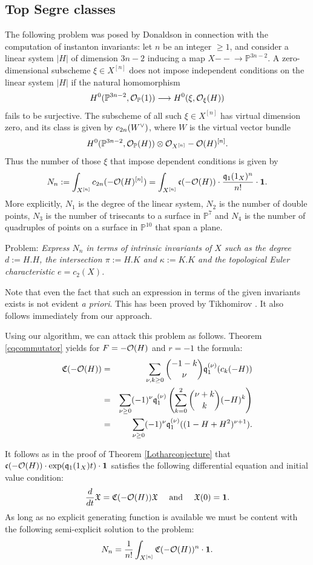\documentclass[twoside,11pt]{article}
\newcommand{\ko}{{\cal O}}
\newcommand{\IP}{{\mathbb P}}
\newcommand{\gothc}{{\mathfrak c}}
\newcommand{\gothq}{{\mathfrak q}}
\newcommand{\gothC}{{\mathfrak C}}
\newcommand{\gothX}{{\mathfrak X}}
\newcommand{\dual}{\makebox[0mm]{}^{{\scriptstyle\vee}}}
\newcommand{\tensor}{\otimes}
\newcommand{\cc}{\gothc}
\newcommand{\qq}{\gothq}
\newcommand{\vacuum}{{\bf 1}}
\newcommand{\lra}{\longrightarrow}
\newcommand{\rationalmap}{{-{}-{}\!\to}}
\begin{document}
\subsection{Top Segre classes}

The following problem was posed by Donaldson in connection with the computation
of instanton invariants: let $n$ be an integer $\geq 1$, and consider a 
linear system $|H|$ of dimension $3n-2$ inducing a map $X\rationalmap
\IP^{3n-2}$. A zero-dimensional subscheme
$\xi\in X^{[n]}$ does not impose  independent conditions on the linear system
$|H|$ if the natural homomorphism
$$H^0(\IP^{3n-2},\ko_\IP(1))\lra H^0(\xi,\ko_\xi(H))$$
fails to be surjective. The subscheme of all such $\xi\in X^{[n]}$ has virtual
dimension zero, and its class is given by $c_{2n}(W\dual)$,
where $W$ is the virtual vector bundle
$$H^0(\IP^{3n-2},\ko_\IP(H))\tensor\ko_{X^{[n]}}-\ko(H)^{[n]}.$$
Thus the number of those $\xi$ that impose dependent conditions is given by
$$N_n:=\int_{X^{[n]}}c_{2n}(-\ko(H)^{[n]})=\int_{X^{[n]}}\cc(-\ko(H))\cdot
\frac{\qq_1(1_X)^n}{n!}\cdot\vacuum.$$
More explicitly, $N_1$ is the degree of the linear system, $N_2$ is the number
of double points, $N_3$ is the number of trisecants to a surface in $\IP^7$
and $N_4$ is the number of quadruples of points on a surface in $\IP^{10}$
that span a plane.

Problem:
{\em Express $N_n$ in terms of intrinsic invariants of $X$ such as the
degree $d:=H.H$, the intersection $\pi:=H.K$ and $\kappa:=K.K$ and
the topological Euler characteristic $e=c_2(X)$.}

Note that even the fact that such an expression in terms of the given invariants
exists is not evident {\em a priori}. This has been proved by Tikhomirov \cite{TikhomirovStandardBundles}.
It also follows immediately from our approach.

Using our algorithm, we can attack this problem as follows.
Theorem \ref{cqcommutator} yields for $F=-\ko(H)$ and $r=-1$ the formula:
\begin{eqnarray*}
\gothC(-\ko(H))
&=&\sum_{\nu,k\geq0}\binom{-1-k}{\nu}\qq_1^{(\nu)}(c_k(-H))\\
&=&\sum_{\nu\geq0}(-1)^\nu\qq_1^{(\nu)}\left(\sum_{k=0}^{2}
\binom{\nu+k}{k}(-H)^k\right)\\
&=&\sum_{\nu\geq0}(-1)^\nu\qq_1^{(\nu)}((1-H+H^2)^{\nu+1}).
\end{eqnarray*}

It follows as in the proof of Theorem \ref{Lotharconjecture}
that $\cc(-\ko(H))\cdot\exp(\qq_1(1_X)t)\cdot\vacuum$ satisfies the
following differential equation and initial value condition:
$$\frac{d}{dt}\gothX=\gothC(-\ko(H))\gothX\quad\mbox{ and }\quad\gothX(0)=\vacuum.$$
As long as no explicit generating function is available we must be content with
the following semi-explicit solution to the problem:
$$N_n=\frac{1}{n!}\int_{X^{[n]}}\gothC(-\ko(H))^n\cdot\vacuum.$$
\end{document}
